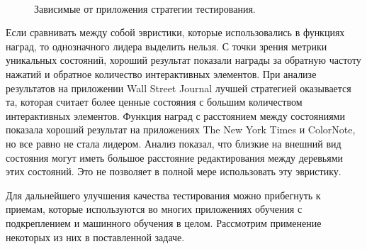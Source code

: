 \begin{figure}[h!]
\centering
{} \\
\caption{Зависимые от приложения стратегии тестирования.}
\label{app_based_picture}
\end{figure}

Если сравнивать между собой эвристики, которые использовались в функциях наград, то однозначного лидера выделить нельзя. С точки зрения метрики уникальных состояний, хороший результат показали награды за обратную частоту нажатий и обратное количество интерактивных элементов. При анализе результатов на приложении Wall Street Journal лучшей стратегией оказывается та, которая считает более ценные состояния с большим количеством интерактивных элементов. Функция наград с расстоянием между состояниями показала хороший результат на приложениях The New York Times и ColorNote, но все равно не стала лидером. Анализ показал, что близкие на внешний вид состояния могут иметь большое расстояние редактирования между деревьями этих состояний. Это не позволяет в полной мере использовать эту эвристику.

Для дальнейшего улучшения качества тестирования можно прибегнуть к приемам, которые используются во многих приложениях обучения с подкреплением и машинного обучения в целом. Рассмотрим применение некоторых из них в поставленной задаче.


